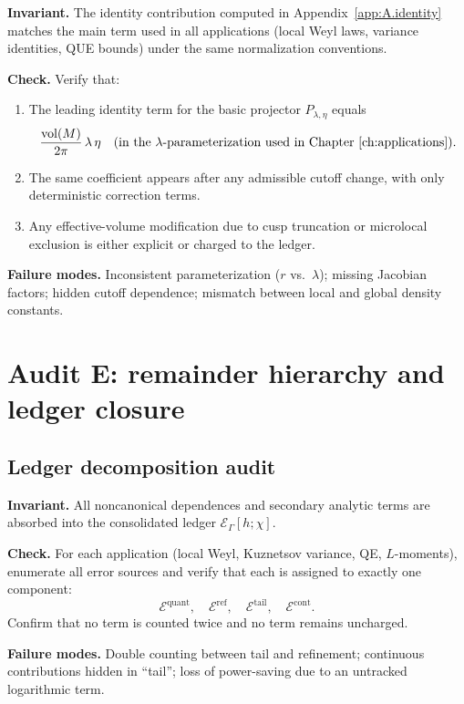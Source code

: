 \begin{audit}
\label{audit:E.D1}
\textbf{Invariant.} The identity contribution computed in Appendix~\ref{app:A.identity} matches the main term used in
all applications (local Weyl laws, variance identities, QUE bounds) under the same normalization conventions.

\textbf{Check.} Verify that:
\begin{enumerate}
\item The leading identity term for the basic projector $P_{\lambda,\eta}$ equals
\[
\frac{\mathop{\mathrm{vol}}\nolimits(M)}{2\pi}\,\lambda\,\eta
\quad
\text{(in the $\lambda$-parameterization used in Chapter~\ref{ch:applications}).}
\]
\item The same coefficient appears after any admissible cutoff change, with only deterministic correction terms.
\item Any effective-volume modification due to cusp truncation or microlocal exclusion is either explicit or charged
to the ledger.
\end{enumerate}

\textbf{Failure modes.} Inconsistent parameterization ($r$ vs.\ $\lambda$); missing Jacobian factors; hidden cutoff
dependence; mismatch between local and global density constants.
\end{audit}

\section{Audit E: remainder hierarchy and ledger closure}
\label{sec:E.audit.ledger}

\subsection{Ledger decomposition audit}
\label{subsec:E.ledger-decomp}

\begin{audit}
\label{audit:E.E1}
\textbf{Invariant.} All noncanonical dependences and secondary analytic terms are absorbed into the consolidated ledger
$\mathcal{E}_\Gamma[h;\chi]$.

\textbf{Check.} For each application (local Weyl, Kuznetsov variance, QE, $L$-moments), enumerate all error sources and
verify that each is assigned to exactly one component:
\[
\mathcal{E}^{\mathrm{quant}},
\quad
\mathcal{E}^{\mathrm{ref}},
\quad
\mathcal{E}^{\mathrm{tail}},
\quad
\mathcal{E}^{\mathrm{cont}}.
\]
Confirm that no term is counted twice and no term remains uncharged.

\textbf{Failure modes.} Double counting between tail and refinement; continuous contributions hidden in ``tail''; loss
of power-saving due to an untracked logarithmic term.
\end{audit}

